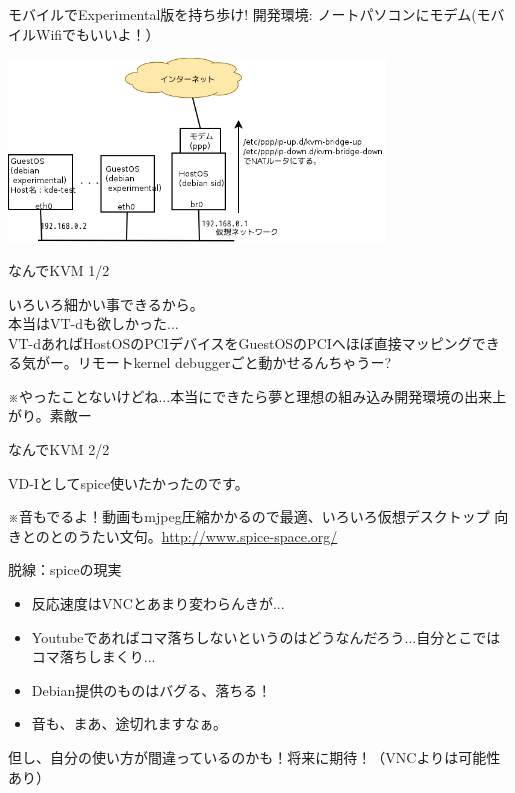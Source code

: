 \begin{frame}{モバイルでExperimental版を持ち歩け!}
開発環境: ノートパソコンにモデム(モバイルWifiでもいいよ！）
\begin{center}
\includegraphics[width=10cm]{image201202/kdedesk/kde-dev-env.png}
\end{center}
\end{frame}

\begin{frame}{なんでKVM 1/2}
\begin{center}
{\Large
いろいろ細かい事できるから。\\
本当はVT-dも欲しかった...} \\

VT-dあればHostOSのPCIデバイスをGuestOSのPCIへほぼ直接マッピングできる気がー。リモートkernel debuggerごと動かせるんちゃうー?\\
\end{center}
※やったことないけどね...本当にできたら夢と理想の組み込み開発環境の出来上がり。素敵ー
\end{frame}

\begin{frame}{なんでKVM 2/2}
\begin{center}
{\Large
VD-Iとしてspice使いたかったのです。\\
}
\end{center}
※音もでるよ！動画もmjpeg圧縮かかるので最適、いろいろ仮想デスクトップ
向きとのとのうたい文句。\url{http://www.spice-space.org/}
\end{frame}

\begin{frame}{脱線：spiceの現実}
\begin{itemize}
\item 反応速度はVNCとあまり変わらんきが...
\item Youtubeであればコマ落ちしないというのはどうなんだろう...自分とこではコマ落ちしまくり...
\item Debian提供のものはバグる、落ちる！
\item 音も、まあ、途切れますなぁ。
\end{itemize}
但し、自分の使い方が間違っているのかも！将来に期待！（VNCよりは可能性あり）
\end{frame}

